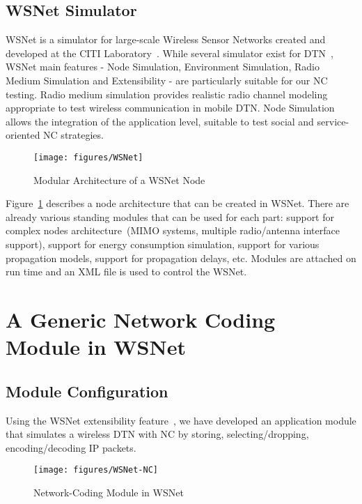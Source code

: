\documentclass[a4paper,twoside]{article}
\begin{document}
\subsection{WSNet Simulator}

WSNet is a simulator for large-scale Wireless Sensor Networks created and developed at the CITI Laboratory~\cite{Fraboulet:2007:WDP:1236360.1236385}. While several simulator exist for DTN~\cite{RomeroAmondaray:2008:DTN:1409985.1410006, keranen-theone}, WSNet main features - Node Simulation, Environment Simulation, Radio Medium Simulation and Extensibility - are particularly suitable for our NC testing. Radio medium simulation provides realistic radio channel modeling appropriate to test wireless communication in mobile DTN. Node Simulation allows the integration of the application level, suitable to test social and service-oriented NC strategies.

\begin{figure}[!hbt]
\centering
\texttt{[image: figures/WSNet]}
\caption{Modular Architecture of a WSNet Node}
\label{fig:wsnet}
\end{figure}

Figure~\ref{fig:wsnet} describes a node architecture that can be created in WSNet. There are already various standing modules that can be used for each part: support for complex nodes architecture~(MIMO systems, multiple radio/antenna interface support), support for energy consumption simulation, support for various propagation models, support for propagation delays, etc. Modules are attached on run time and an XML file is used to control the WSNet. 

\section{A Generic Network Coding Module in WSNet}
\label{section:nc-module}

\subsection{Module Configuration}

Using the WSNet extensibility feature~\cite{BenHamida2007a}, we have developed an application module that simulates a wireless DTN with NC by storing, selecting/dropping, encoding/decoding IP packets.

\begin{figure}[!hbt]
\centering
\texttt{[image: figures/WSNet-NC]}
\caption{Network-Coding Module in WSNet}
\label{fig:wsnet-nc}
\end{figure}
\end{document}
